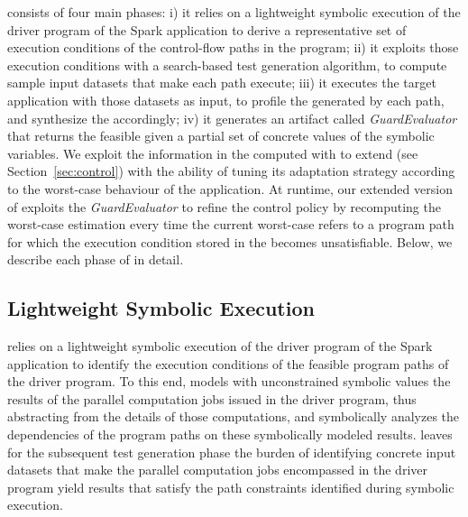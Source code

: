 \approach consists of four main phases: i) it relies on a lightweight symbolic execution of the driver program of the Spark application to derive a representative set of execution conditions of the control-flow paths in the program; ii) it exploits those execution conditions with a search-based test generation algorithm, to compute sample input datasets that make each path execute; iii) it executes the target application with those datasets as input, to profile the \plan generated by each path, and synthesize the \model accordingly; iv) it generates an artifact called \textit{GuardEvaluator} that returns the feasible \plans given a partial set of concrete values of the symbolic variables.
We exploit the information in the \model computed with \approach to extend \cSpark (see Section~\ref{sec:control}) with the ability of tuning its adaptation strategy according to the worst-case behaviour of the application. At runtime, our extended version of \cSpark exploits the \textit{GuardEvaluator} to refine the control policy by recomputing the worst-case estimation every time the current worst-case refers to a program path for which the execution condition stored in the \model becomes unsatisfiable.
%
Below, we describe each phase of \approach in detail.

\subsection{Lightweight Symbolic Execution}\label{sec:lightweight_symbolic_execution}
\approach relies on a lightweight symbolic execution of the driver program of the Spark application to identify the execution conditions of the feasible program paths of the driver program. To this end, \approach
models with unconstrained symbolic values the results of the parallel computation jobs issued in the driver program, 
thus abstracting from the details of those computations, and symbolically  analyzes the dependencies of the program paths on these symbolically modeled results.
\approach leaves for the subsequent test generation phase the burden of identifying concrete input datasets that make the parallel computation jobs encompassed in the driver program yield results that satisfy the path constraints identified during symbolic execution.

